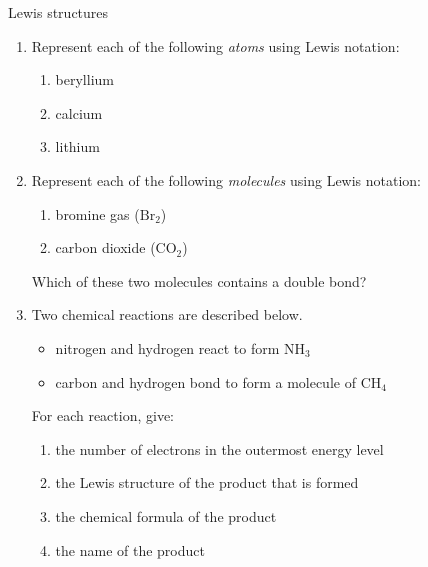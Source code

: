     \noindent
\label{m38701*secfhsst!!!underscore!!!id327}
            \begin{exercises}{Lewis structures}
            \nopagebreak \noindent
      \label{m38701*id140889}\begin{enumerate}[noitemsep, label=\textbf{\arabic*}. ] 
            \label{m38701*uid23}\item Represent each of the following \textsl{atoms} using Lewis notation:
\label{m38701*id140910}\begin{enumerate}[noitemsep, label=\textbf{\alph*}. ] 
            \label{m38701*uid24}\item beryllium
\label{m38701*uid25}\item calcium
\label{m38701*uid26}\item lithium
\end{enumerate}
                \label{m38701*uid27}\item Represent each of the following \textsl{molecules} using Lewis notation:
\label{m38701*id140969}\begin{enumerate}[noitemsep, label=\textbf{\alph*}. ] 
            \label{m38701*uid28}\item bromine gas ($\text{Br}{}_{2}$)
\label{m38701*uid29}\item carbon dioxide ($\text{CO}{}_{2}$)
\end{enumerate}
Which of these two molecules contains a double bond?\newline
\label{m38701*uid31}\item Two chemical reactions are described below.
\label{m38701*id141048}\begin{itemize}[noitemsep]
            \label{m38701*uid32}\item nitrogen and hydrogen react to form $\text{NH}_{3}$\label{m38701*uid33}
\item carbon and hydrogen bond to form a molecule of $\text{CH}_{4}$\end{itemize}
For each reaction, give:
\label{m38701*id141106}\begin{enumerate}[noitemsep, label=\textbf{\alph*}. ] 
\item the number of electrons in the outermost energy level
\label{m38701*uid35}\item the Lewis structure of the product that is formed
\label{m38701*uid36}\item the chemical formula of the product
\label{m38701*uid37}\item the name of the product

\end{enumerate}
\end{enumerate}
\end{exercises}
